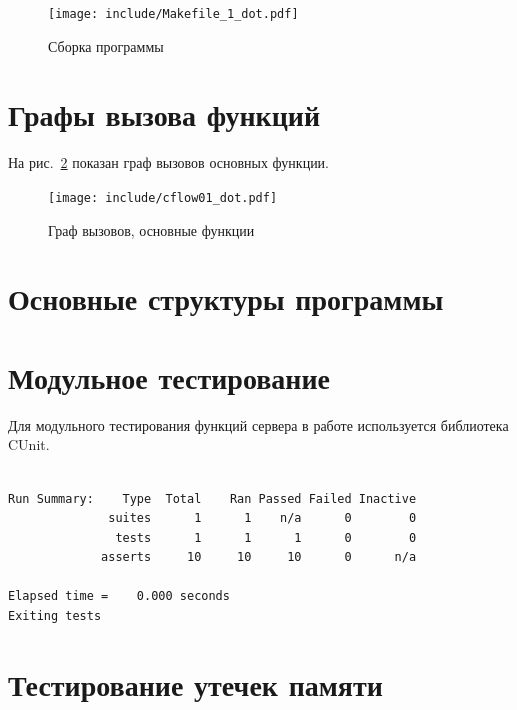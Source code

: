 \documentclass[a4paper,12pt]{report}
\begin{document}
\begin{figure}
\centering
\texttt{[image: include/Makefile\_1\_dot.pdf]}
\caption{Сборка программы}
\label{fig:make}
\end{figure}

%
%
%
%
%
%
%
%

\section{Графы вызова функций}

На рис.~\ref{fig:cflow01} показан граф вызовов основных функции.

\begin{figure}
\centering
\texttt{[image: include/cflow01\_dot.pdf]}
\caption{Граф вызовов, основные функции}
\label{fig:cflow01}
\end{figure}

\section{Основные структуры программы}







\section{Модульное тестирование}
Для модульного тестирования функций сервера в работе используется библиотека CUnit.
\begin{verbatim}

Run Summary:    Type  Total    Ran Passed Failed Inactive
              suites      1      1    n/a      0        0
               tests      1      1      1      0        0
             asserts     10     10     10      0      n/a

Elapsed time =    0.000 seconds
Exiting tests
\end{verbatim}

\section{Тестирование утечек памяти}
\end{document}
